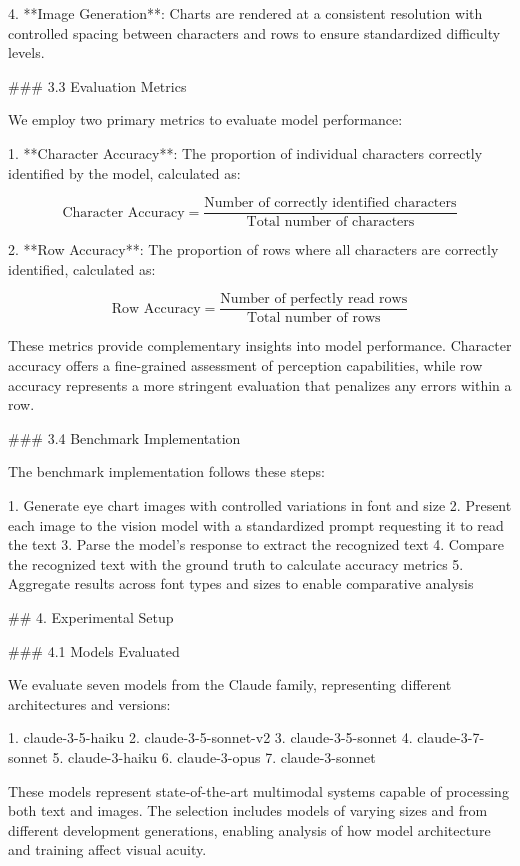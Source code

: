 \documentclass{article}
\begin{document}
4. **Image Generation**: Charts are rendered at a consistent resolution with controlled spacing between characters and rows to ensure standardized difficulty levels.

### 3.3 Evaluation Metrics

We employ two primary metrics to evaluate model performance:

1. **Character Accuracy**: The proportion of individual characters correctly identified by the model, calculated as:

   $$\text{Character Accuracy} = \frac{\text{Number of correctly identified characters}}{\text{Total number of characters}}$$

2. **Row Accuracy**: The proportion of rows where all characters are correctly identified, calculated as:

   $$\text{Row Accuracy} = \frac{\text{Number of perfectly read rows}}{\text{Total number of rows}}$$

These metrics provide complementary insights into model performance. Character accuracy offers a fine-grained assessment of perception capabilities, while row accuracy represents a more stringent evaluation that penalizes any errors within a row.

### 3.4 Benchmark Implementation

The benchmark implementation follows these steps:

1. Generate eye chart images with controlled variations in font and size
2. Present each image to the vision model with a standardized prompt requesting it to read the text
3. Parse the model's response to extract the recognized text
4. Compare the recognized text with the ground truth to calculate accuracy metrics
5. Aggregate results across font types and sizes to enable comparative analysis

## 4. Experimental Setup

### 4.1 Models Evaluated

We evaluate seven models from the Claude family, representing different architectures and versions:

1. claude-3-5-haiku
2. claude-3-5-sonnet-v2
3. claude-3-5-sonnet
4. claude-3-7-sonnet
5. claude-3-haiku
6. claude-3-opus
7. claude-3-sonnet

These models represent state-of-the-art multimodal systems capable of processing both text and images. The selection includes models of varying sizes and from different development generations, enabling analysis of how model architecture and training affect visual acuity.
\end{document}
